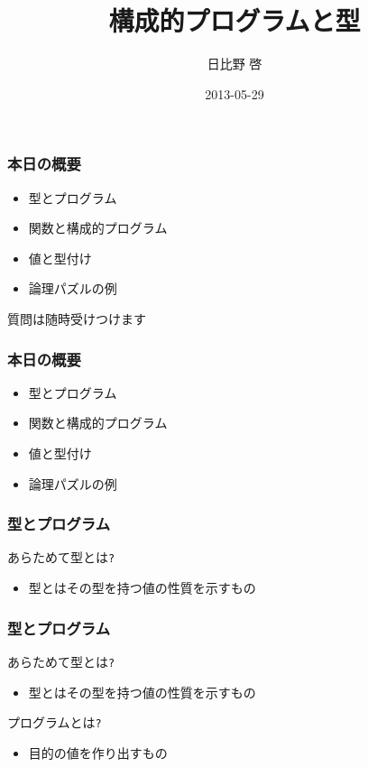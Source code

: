 \documentclass[cjk,dvipdfm,14pt]{beamer}
\title{構成的プログラムと型}
\author{日比野 啓}
\date{2013-05-29}
\begin{document}
\begin{frame}
\maketitle
\end{frame}

\begin{frame}[fragile]
\frametitle{本日の概要}

\begin{itemize}
\item 型とプログラム
\item 関数と構成的プログラム
\item 値と型付け
\item 論理パズルの例
\end{itemize}

\end{frame}

\begin{frame}[fragile]
質問は随時受けつけます
\end{frame}

\begin{frame}[fragile]
\frametitle{本日の概要}

\begin{itemize}
\item { \color{red} 型とプログラム }
\item 関数と構成的プログラム
\item 値と型付け
\item 論理パズルの例
\end{itemize}

\end{frame}

\begin{frame}[fragile]
\frametitle{型とプログラム}
あらためて型とは\verb|?|
\begin{itemize}
\item { \color{red} 型とはその型を持つ値の性質を示すもの }
\end{itemize}
\end{frame}

\begin{frame}[fragile]
\frametitle{型とプログラム}

あらためて型とは\verb|?|
\begin{itemize}
\item 型とはその型を持つ値の性質を示すもの
\end{itemize}

プログラムとは\verb|?|
\begin{itemize}
\item { \color{red} 目的の値を作り出すもの }
\end{itemize}

\end{frame}
\end{document}
